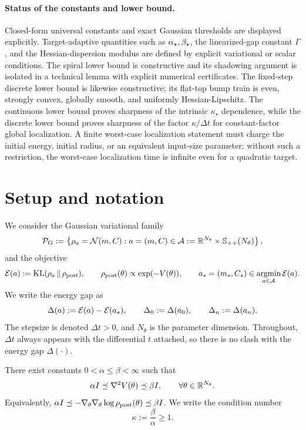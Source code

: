 \paragraph{Status of the constants and lower bound.}
Closed-form universal constants and exact Gaussian thresholds are displayed explicitly.
Target-adaptive quantities such as $\alpha_\star,\beta_\star$, the linearized-gap constant $\Gamma$,
and the Hessian-dispersion modulus are defined by explicit variational or scalar conditions.
The spiral lower bound is constructive and its shadowing argument is isolated in a technical lemma
with explicit numerical certificates.  The fixed-step discrete lower bound is likewise constructive;
its flat-top bump train is even, strongly convex, globally smooth, and uniformly Hessian-Lipschitz.
The continuous lower bound proves sharpness of the intrinsic $\kappa_\star$ dependence, while the
discrete lower bound proves sharpness of the factor $\kappa/\Delta t$ for constant-factor global
localization.  A finite worst-case localization statement must charge the initial energy, initial
radius, or an equivalent input-size parameter: without such a restriction, the worst-case
localization time is infinite even for a quadratic target.

\section{Setup and notation}

We consider the Gaussian variational family
\[
    \mathcal{P}_{\mathrm G}
    :=
    \left\{
        \rho_a=\mathcal{N}(m,C):
        a=(m,C)\in\mathcal{A}:=\mathbb{R}^{N_\theta}\times\mathbb{S}_{++}(N_\theta)
    \right\},
\]
and the objective
\[
    \mathcal{E}(a)
    :=
    \mathrm{KL}(\rho_a\,\|\,\rho_{\mathrm{post}}),
    \qquad
    \rho_{\mathrm{post}}(\theta)\propto \exp(-V(\theta)),
    \qquad
    a_\star=(m_\star,C_\star)
    \in
    \operatorname*{argmin}_{a\in\mathcal{A}}\mathcal{E}(a).
\]
We write the energy gap as
\[
    \Delta(a):=\mathcal{E}(a)-\mathcal{E}(a_\star),
    \qquad
    \Delta_0:=\Delta(a_0),
    \qquad
    \Delta_n:=\Delta(a_n).
\]
The stepsize is denoted $\Delta t>0$, and $N_\theta$ is the parameter dimension. Throughout,
$\Delta t$ always appears with the differential $t$ attached, so there is no clash with the
energy gap $\Delta(\cdot)$.

\begin{assumption}
\label{assump:logconcave-smooth}
There exist constants $0<\alpha\leq \beta<\infty$ such that
\[
    \alpha I
    \preceq
    \nabla^2V(\theta)
    \preceq
    \beta I,
    \qquad
    \forall \theta\in\mathbb{R}^{N_\theta}.
\]
Equivalently, $\alpha I\preceq -\nabla_\theta\nabla_\theta\log\rho_{\mathrm{post}}(\theta)\preceq\beta I$.
We write the condition number
\[
    \kappa:=\frac{\beta}{\alpha}\geq 1.
\]
\end{assumption}

